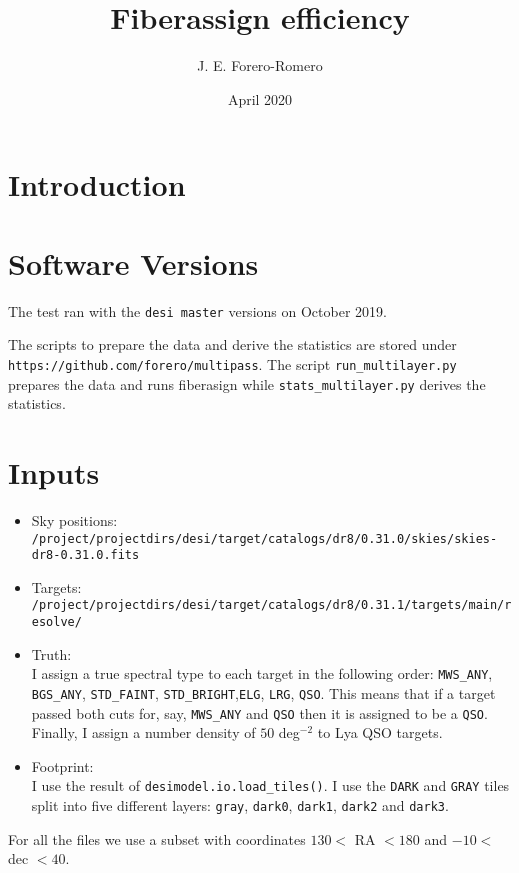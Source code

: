 \documentclass{article}
\title{Fiberassign efficiency}
\author{J. E. Forero-Romero}
\date{April 2020}
\begin{document}
\maketitle

\section{Introduction}


\section{Software Versions}

The test ran with the \verb'desi master' versions on October 2019.

The scripts to prepare the data and derive the statistics are stored
under \verb"https://github.com/forero/multipass". The script
\verb'run_multilayer.py' prepares the data and runs fiberasign while
\verb'stats_multilayer.py' derives the statistics.

\section{Inputs}

\begin{itemize}
\item Sky positions: \\
\verb"/project/projectdirs/desi/target/catalogs/dr8/0.31.0/skies/skies-dr8-0.31.0.fits"
\item Targets:\\
\verb"/project/projectdirs/desi/target/catalogs/dr8/0.31.1/targets/main/resolve/"
\item Truth:\\
I assign a true spectral type to each target in the
following order:
\verb'MWS_ANY', \verb'BGS_ANY', \verb'STD_FAINT',
\verb'STD_BRIGHT',\verb'ELG', \verb'LRG', \verb'QSO'.
This means that if a target passed both cuts for, say, \verb'MWS_ANY' and
\verb'QSO' then it is assigned to be a \verb'QSO'.
Finally, I assign a number density of $50$ deg$^{-2}$
to Lya QSO targets.

\item Footprint:\\
I use the result of \verb'desimodel.io.load_tiles()'.
I use the \verb"DARK" and \verb"GRAY" tiles split into 
five different layers: \verb`gray`,
\verb'dark0', \verb'dark1', \verb'dark2' and \verb'dark3'.

\end{itemize}
For all the files we use a subset with coordinates 
$130<$ RA $<180$ and
$-10<$ dec $<40$. 
\end{document}
